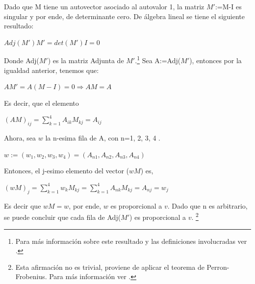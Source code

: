 \documentclass[11pt]{article}
\begin{document}
Dado que M tiene un autovector asociado al autovalor 1, la matriz $M'$:=M-I es singular y por ende, de 
determinante cero.\newline
De álgebra lineal se tiene el siguiente resultado:\newline
\begin{center}
$Adj(M')M' = det(M')I=0$
\end{center}
Donde Adj($M'$) es la matriz Adjunta de $M'$.\footnote{Para más información sobre este resultado y las definiciones involucradas ver \cite{Ho}.}\newline 
Sea A:=Adj($M'$), entonces por la igualdad anterior, tenemos que:
\begin{center}
$AM'=A(M-I)=0 \Rightarrow AM=A$
\end{center}
Es decir, que el elemento 
\begin{center}
$(AM)_{ij}=\sum_{k=1}^4 A_{ik} M_{kj} = A_{ij}$
\end{center}
Ahora, sea $w$ la n-esima fila de A, con n=1, 2, 3, 4 .
\begin{center}
$w:=(w_1,w_2,w_3,w_4)=(A_{n1},A_{n2},A_{n3},A_{n4})$
\end{center}
Entonces, el j-esimo elemento del vector ($w M$) es,
\begin{center}
$(w M)_j=\sum_{k=1}^4 w_k M_{kj} =\sum_{k=1}^4 A_{nk} M_{kj} = A_{nj}=w_j$
\end{center}
Es decir que $w M= w$, por ende, $w$ es proporcional a $v$.
Dado que n es arbitrario, se puede concluir que cada fila de Adj($M'$) es proporcional a $v$.
\footnote{Esta afirmación no es trivial, proviene de aplicar el teorema de Perron-Frobenius. Para más información ver \cite{Ha}.}
\end{document}
